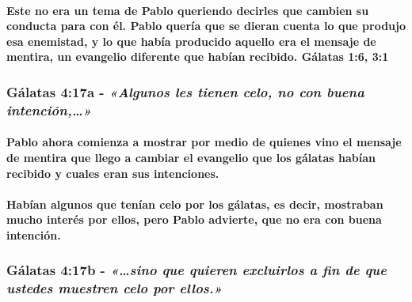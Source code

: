 \documentclass[11a pt,twoside]{article}
\newcommand{\scripture}[1]{%
  {\fontsize{12pt}{16pt}\selectfont\ScriptureFont\itshape #1}%
}
\let\oldsubsubsection\subsubsection
\renewcommand{\subsubsection}{\needspace{4\baselineskip}\oldsubsubsection}
\let\oldparagraph\paragraph
\renewcommand{\paragraph}{\needspace{3\baselineskip}\oldparagraph}
\begin{document}
\paragraph{Este no era un tema de Pablo queriendo decirles que cambien
su conducta para con él. Pablo quería que se dieran cuenta lo que
produjo esa enemistad, y lo que había producido aquello era el mensaje
de mentira, un evangelio diferente que habían recibido. Gálatas 1:6,
3:1}\label{este-no-era-un-tema-de-pablo-queriendo-decirles-que-cambien-su-conducta-para-con-uxe9l.-pablo-queruxeda-que-se-dieran-cuenta-lo-que-produjo-esa-enemistad-y-lo-que-habuxeda-producido-aquello-era-el-mensaje-de-mentira-un-evangelio-diferente-que-habuxedan-recibido.-guxe1latas-16-31}

\subsubsection{\texorpdfstring{Gálatas 4:17a -
\scripture{«Algunos les tienen celo, no con buena intención,…»}}{Gálatas 4:17a - }}\label{guxe1latas-417a---algunos-les-tienen-celo-no-con-buena-intenciuxf3n}

\paragraph{Pablo ahora comienza a mostrar por medio de quienes vino el
mensaje de mentira que llego a cambiar el evangelio que los gálatas
habían recibido y cuales eran sus
intenciones.}\label{pablo-ahora-comienza-a-mostrar-por-medio-de-quienes-vino-el-mensaje-de-mentira-que-llego-a-cambiar-el-evangelio-que-los-guxe1latas-habuxedan-recibido-y-cuales-eran-sus-intenciones.}

\paragraph{Habían algunos que tenían celo por los gálatas, es decir,
mostraban mucho interés por ellos, pero Pablo advierte, que no era con
buena
intención.}\label{habuxedan-algunos-que-tenuxedan-celo-por-los-guxe1latas-es-decir-mostraban-mucho-interuxe9s-por-ellos-pero-pablo-advierte-que-no-era-con-buena-intenciuxf3n.}

\subsubsection{\texorpdfstring{Gálatas 4:17b -
\scripture{«…sino que quieren excluirlos a fin de que ustedes muestren celo por ellos.»}}{Gálatas 4:17b - }}\label{guxe1latas-417b---sino-que-quieren-excluirlos-a-fin-de-que-ustedes-muestren-celo-por-ellos.}
\end{document}

